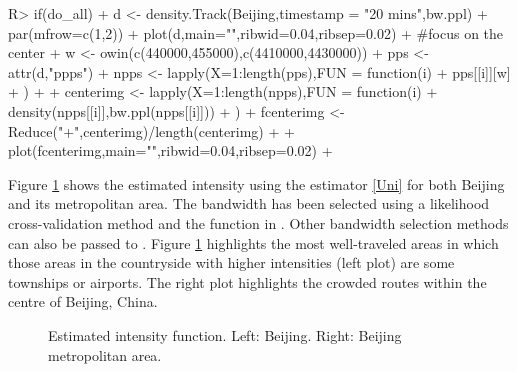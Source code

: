\documentclass[article]{jss}
\begin{document}
\begin{Schunk}
\begin{Sinput}
R>  if(do_all){
+   d <- density.Track(Beijing,timestamp = "20 mins",bw.ppl)
+   par(mfrow=c(1,2))
+   plot(d,main="",ribwid=0.04,ribsep=0.02)
+   #focus on the center
+   w <- owin(c(440000,455000),c(4410000,4430000))
+   pps <- attr(d,"ppps")
+   npps <- lapply(X=1:length(pps),FUN = function(i){
+     pps[[i]][w]
+   })
+   
+   centerimg <- lapply(X=1:length(npps),FUN = function(i){
+     density(npps[[i]],bw.ppl(npps[[i]]))
+   })
+   fcenterimg <- Reduce("+",centerimg)/length(centerimg)
+   
+   plot(fcenterimg,main="",ribwid=0.04,ribsep=0.02)
+   }
\end{Sinput}
\end{Schunk}
Figure \ref{bijingint} shows the estimated intensity using the estimator \eqref{Uni} for both Beijing and its metropolitan area. The bandwidth has been selected using a likelihood cross-validation method and the function  in . Other bandwidth selection methods can also be passed to . Figure \ref{bijingint} highlights the most well-traveled areas in which those areas in the countryside with higher intensities (left plot) are some townships or airports. The right plot highlights the crowded routes within the centre of Beijing, China.
  \begin{figure}[!h]
  \centering
  \caption{Estimated intensity function. Left: Beijing. Right: Beijing metropolitan area.}
  \label{bijingint}
  \end{figure}
\end{document}
